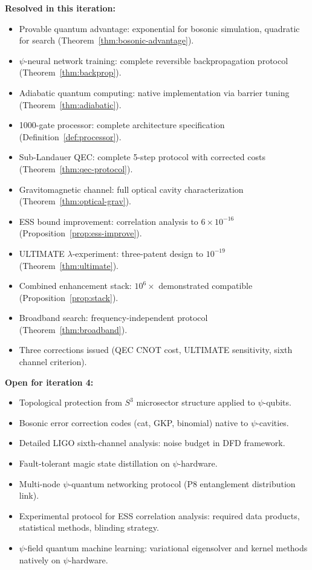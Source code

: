 \documentclass[11pt]{article}
\theoremstyle{definition}
\theoremstyle{remark}
\begin{document}
\textbf{Resolved in this iteration:}
\begin{itemize}[nosep]
\item Provable quantum advantage: exponential for bosonic simulation,
quadratic for search (Theorem~\ref{thm:bosonic-advantage}).
\item $\psi$-neural network training: complete reversible backpropagation
protocol (Theorem~\ref{thm:backprop}).
\item Adiabatic quantum computing: native implementation via barrier
tuning (Theorem~\ref{thm:adiabatic}).
\item 1000-gate processor: complete architecture specification
(Definition~\ref{def:processor}).
\item Sub-Landauer QEC: complete 5-step protocol with corrected costs
(Theorem~\ref{thm:qec-protocol}).
\item Gravitomagnetic channel: full optical cavity characterization
(Theorem~\ref{thm:optical-grav}).
\item ESS bound improvement: correlation analysis to $6\times10^{-16}$
(Proposition~\ref{prop:ess-improve}).
\item ULTIMATE $\lambda$-experiment: three-patent design to $10^{-19}$
(Theorem~\ref{thm:ultimate}).
\item Combined enhancement stack: $10^6\times$ demonstrated compatible
(Proposition~\ref{prop:stack}).
\item Broadband search: frequency-independent protocol
(Theorem~\ref{thm:broadband}).
\item Three corrections issued (QEC CNOT cost, ULTIMATE sensitivity,
sixth channel criterion).
\end{itemize}

\textbf{Open for iteration 4:}
\begin{itemize}[nosep]
\item Topological protection from $S^3$ microsector structure applied
to $\psi$-qubits.
\item Bosonic error correction codes (cat, GKP, binomial) native to
$\psi$-cavities.
\item Detailed LIGO sixth-channel analysis: noise budget in DFD framework.
\item Fault-tolerant magic state distillation on $\psi$-hardware.
\item Multi-node $\psi$-quantum networking protocol (P8 entanglement
distribution link).
\item Experimental protocol for ESS correlation analysis: required data
products, statistical methods, blinding strategy.
\item $\psi$-field quantum machine learning: variational eigensolver
and kernel methods natively on $\psi$-hardware.
\end{itemize}
\end{document}
